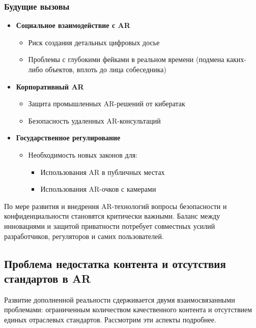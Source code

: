 \subsubsection{Будущие вызовы}
\begin{itemize}
    \item \textbf{Социальное взаимодействие с AR}
    \begin{itemize}
        \item Риск создания детальных цифровых досье
        \item Проблемы с глубокими фейками в реальном времени (подмена каких-либо объектов, вплоть до лица собеседника)
    \end{itemize}
    
    \item \textbf{Корпоративный AR}
    \begin{itemize}
        \item Защита промышленных AR-решений от кибератак
        \item Безопасность удаленных AR-консультаций
    \end{itemize}
    
    \item \textbf{Государственное регулирование}
    \begin{itemize}
        \item Необходимость новых законов для:
        \begin{itemize}
            \item Использования AR в публичных местах
            \item Использования AR-очков с камерами
        \end{itemize}
    \end{itemize}
\end{itemize}

По мере развития и внедрения AR-технологий вопросы безопасности и конфиденциальности становятся критически важными. Баланс между инновациями и защитой приватности потребует совместных усилий разработчиков, регуляторов и самих пользователей.

\subsection{Проблема недостатка контента и отсутствия стандартов в AR}
Развитие дополненной реальности сдерживается двумя взаимосвязанными проблемами: ограниченным количеством качественного контента и отсутствием единых отраслевых стандартов. Рассмотрим эти аспекты подробнее.

